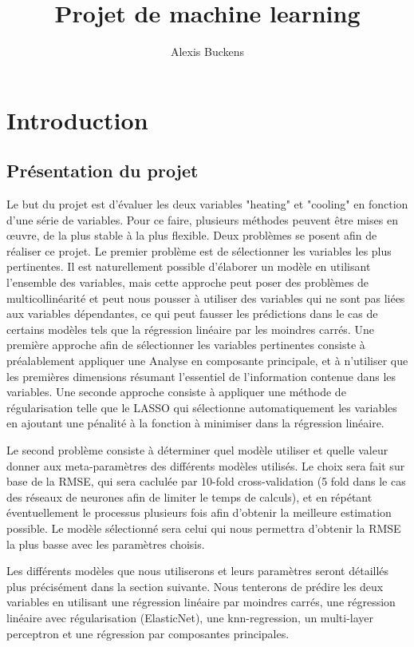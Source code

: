 \documentclass[11pt,a4paper]{article}
\author{Alexis Buckens}
\title{Projet de machine learning}
\begin{document}
\maketitle
\section{Introduction}
\subsection{Présentation du projet}

Le but du projet est d'évaluer les deux variables "heating" et "cooling" en fonction d'une série de variables. Pour ce faire, plusieurs méthodes peuvent être mises en \oe uvre, de la plus stable à la plus flexible. Deux problèmes se posent afin de réaliser ce projet. Le premier problème est de sélectionner les variables les plus pertinentes. Il est naturellement possible d'élaborer un modèle en utilisant l'ensemble des variables, mais cette approche peut poser des problèmes de multicollinéarité et peut nous pousser à utiliser des variables qui ne sont pas liées aux variables dépendantes, ce qui peut fausser les prédictions dans le cas de certains modèles tels que la régression linéaire par les moindres carrés. Une première approche afin de sélectionner les variables pertinentes consiste à préalablement appliquer une Analyse en composante principale, et à n'utiliser que les premières dimensions résumant l'essentiel de l'information contenue dans les variables. Une seconde approche consiste à appliquer une méthode de régularisation telle que le LASSO qui sélectionne automatiquement les variables en ajoutant une pénalité à la fonction à minimiser dans la régression linéaire.

Le second problème consiste à déterminer quel modèle utiliser et quelle valeur donner aux meta-paramètres des différents modèles utilisés. Le choix sera fait sur base de la RMSE, qui sera caclulée par 10-fold cross-validation (5 fold dans le cas des réseaux de neurones afin de limiter le temps de calculs), et en répétant éventuellement le processus plusieurs fois afin d'obtenir la meilleure estimation possible. Le modèle sélectionné sera celui qui nous permettra d'obtenir la RMSE la plus basse avec les paramètres choisis.

Les différents modèles que nous utiliserons et leurs paramètres seront détaillés plus précisément dans la section suivante. Nous tenterons de prédire les deux variables en utilisant une régression linéaire par moindres carrés, une régression linéaire avec régularisation (ElasticNet), une knn-regression, un multi-layer perceptron et une régression par composantes principales.
\end{document}
